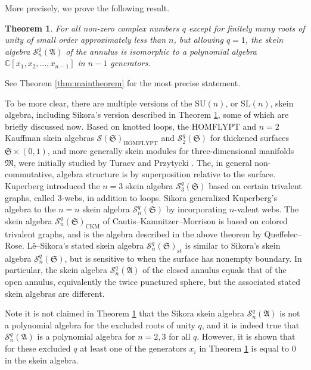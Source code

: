 \documentclass[12pt,
	]{amsart}
\newtheorem{introtheorem}{Theorem}
\theoremstyle{definition}
\newcommand{\mrm}[1]{\mathrm{#1}}
\newcommand{\mbb}[1]{\mathbb{#1}}
\newcommand{\mcal}[1]{\mathcal{#1}}
\newcommand{\mfrak}[1]{\mathfrak{#1}}
\newcommand{\C}{\mbb{C}}
\newcommand{\nsl}{\mrm{SL}(n)}
\newcommand{\sk}{\mcal{S}_n^q}
\newcommand{\ann}{\mfrak{A}}
\newcommand{\man}{\mfrak{M}}
\newcommand{\surf}{\mfrak{S}}
\begin{document}
More precisely, we prove the following result.

\begin{introtheorem}\label{thm:intromaintheorem}
For all non-zero complex numbers $q$ except for finitely many roots of unity of small order approximately less than $n$, but allowing $q=1$, the skein algebra $\sk(\ann)$ of the annulus is isomorphic to a polynomial algebra $\C[x_1,x_2,\dots,x_{n-1}]$ in $n-1$ generators.  
\end{introtheorem}

See Theorem \ref{thm:maintheorem} for the most precise statement.  

To be more clear, there are multiple versions of the $\mrm{SU}(n)$, or $\nsl$, skein algebra, including Sikora's version described in Theorem \ref{thm:intromaintheorem}, some of which are briefly discussed now.  Based on knotted loops, the HOMFLYPT \cite{FreydBullAmerMathSoc85, Przytycki87ProcAmercMathSoc} and $n=2$ Kauffman \cite{KauffmanTopology87} skein algebras $\mcal{S}(\surf)_\mathrm{HOMFLYPT}$ and $\mcal{S}_2^q(\surf)$ for thickened surfaces $\surf\times(0,1)$, and more generally skein modules for three-dimensional manifolds $\man$, were initially studied by Turaev \cite{turaevMR0964255} and Przytycki \cite{PrzytyckiBullPolishAcad91}.  The, in general non-commutative, algebra structure is by superposition relative to the surface.  Kuperberg \cite{KuperbergCommMathPhys96} introduced the $n=3$ skein algebra $\mcal{S}_3^q(\surf)$ based on certain trivalent graphs, called $3$-webs, in addition to loops.  Sikora \cite{SikoraAlgGeomTop05} generalized Kuperberg's algebra to the $n=n$ skein algebra $\sk(\surf)$ by incorporating $n$-valent webs.  The skein algebra $\mcal{S}^q_n(\surf)_\mathrm{CKM}$ of Cautis--Kamnitzer--Morrison \cite{CautisMathAnn14} is based on colored trivalent graphs, and is the algebra described in the above theorem by Queffelec--Rose.  L\^{e}--Sikora's \cite{leMR3827810, LeArxiv21} stated skein algebra $\mcal{S}^q_n(\surf)_\mathrm{st}$ is similar to Sikora's skein algebra $\sk(\surf)$, but is sensitive to when the surface has nonempty boundary.  In particular, the skein algebra $\sk(\ann)$ of the closed annulus equals that of the open annulus, equivalently the twice punctured sphere, but the associated stated skein algebras are different.  

Note it is not claimed in Theorem \ref{thm:intromaintheorem} that the Sikora skein algebra $\sk(\ann)$ is not a polynomial algebra for the excluded roots of unity $q$, and it is indeed true that $\sk(\ann)$ is a polynomial algebra for $n=2,3$ for all $q$.  However, it is shown that for these excluded $q$ at least one of the generators $x_i$ in Theorem \ref{thm:intromaintheorem} is equal to $0$ in the skein algebra.  
\end{document}

